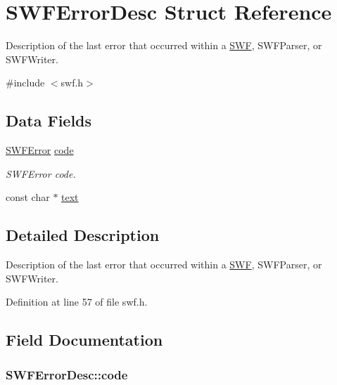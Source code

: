 \hypertarget{struct_s_w_f_error_desc}{}\section{S\+W\+F\+Error\+Desc Struct Reference}
\label{struct_s_w_f_error_desc}


Description of the last error that occurred within a \hyperlink{struct_s_w_f}{S\+W\+F}, S\+W\+F\+Parser, or S\+W\+F\+Writer.  




{\ttfamily \#include $<$swf.\+h$>$}

\subsection*{Data Fields}
\begin{DoxyCompactItemize}
\item 
\hyperlink{swf_8h_ac5e09b34f3a970beec42aa757ffb3e99}{S\+W\+F\+Error} \hyperlink{struct_s_w_f_error_desc_a015c657c922b53342ee1aa321be29084}{code}
\begin{DoxyCompactList}\small\item\em S\+W\+F\+Error code. \end{DoxyCompactList}\item 
const char $\ast$ \hyperlink{struct_s_w_f_error_desc_ae8e679264f1fce07de9795638f760ca0}{text}
\end{DoxyCompactItemize}


\subsection{Detailed Description}
Description of the last error that occurred within a \hyperlink{struct_s_w_f}{S\+W\+F}, S\+W\+F\+Parser, or S\+W\+F\+Writer. 

Definition at line 57 of file swf.\+h.



\subsection{Field Documentation}
\hypertarget{struct_s_w_f_error_desc_a015c657c922b53342ee1aa321be29084}{}
\subsubsection[{code}]{ S\+W\+F\+Error\+Desc\+::code}\label{struct_s_w_f_error_desc_a015c657c922b53342ee1aa321be29084}


